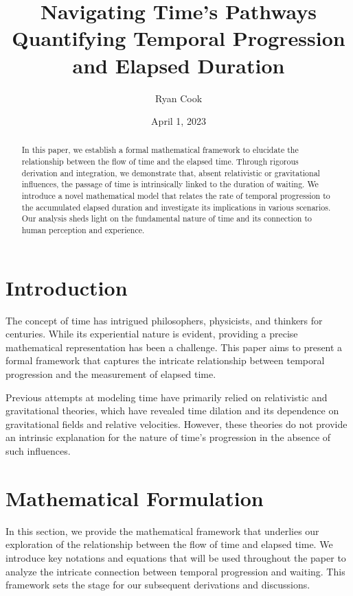 \documentclass{article}
\title{Navigating Time's Pathways \\[1ex] \large Quantifying Temporal Progression and Elapsed Duration}
\author{Ryan Cook}
\date{April 1, 2023}
\begin{document}
\maketitle

\begin{abstract}
    In this paper, we establish a formal mathematical framework to elucidate the relationship between the flow of time and the elapsed time. Through rigorous derivation and integration, we demonstrate that, absent relativistic or gravitational influences, the passage of time is intrinsically linked to the duration of waiting. We introduce a novel mathematical model that relates the rate of temporal progression to the accumulated elapsed duration and investigate its implications in various scenarios. Our analysis sheds light on the fundamental nature of time and its connection to human perception and experience.
\end{abstract}


\section{Introduction}
The concept of time has intrigued philosophers, physicists, and thinkers for centuries. While its experiential nature is evident, providing a precise mathematical representation has been a challenge. This paper aims to present a formal framework that captures the intricate relationship between temporal progression and the measurement of elapsed time.

Previous attempts at modeling time have primarily relied on relativistic and gravitational theories, which have revealed time dilation and its dependence on gravitational fields and relative velocities. However, these theories do not provide an intrinsic explanation for the nature of time's progression in the absence of such influences.

\section{Mathematical Formulation}

In this section, we provide the mathematical framework that underlies our exploration of the relationship between the flow of time and elapsed time. We introduce key notations and equations that will be used throughout the paper to analyze the intricate connection between temporal progression and waiting. This framework sets the stage for our subsequent derivations and discussions.
\end{document}
